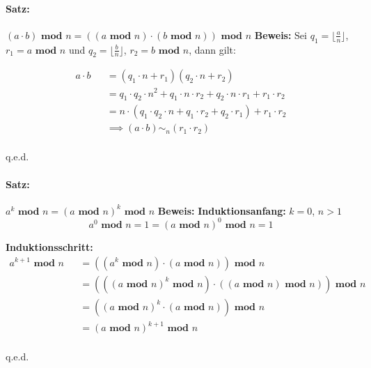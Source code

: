 \documentclass[12pt]{scrreprt}
\newcommand{\theorem}[1]{\paragraph{Satz:} #1\newline}
\renewcommand{\mod}{\textbf{ mod }}
\newenvironment{proof}
    {\textbf{Beweis:}\newline\indent}
    {\begin{flushright}q.e.d.\end{flushright}}
\begin{document}
                \theorem{$ (a \cdot b) \mod n = ((a \mod n) \cdot (b \mod n)) \mod n $}
                    \begin{proof}
                        Sei $ q _ 1 = \lfloor \frac{a}{n} \rfloor $, $ r _ 1 = a \mod n $ und $ q _ 2 = \lfloor \frac{b}{n} \rfloor $, $ r _ 2 = b \mod n $, dann gilt:

                        \begin{eqnarray*}
                                 a \cdot b
                            && = (q _ 1 \cdot n + r _ 1) (q _ 2 \cdot n + r _ 2)                                                            \\
                            && = q _ 1 \cdot q _ 2 \cdot n ^ 2 + q _ 1 \cdot n \cdot r _ 2 + q _ 2 \cdot n \cdot r _ 1 + r _ 1 \cdot r _ 2  \\
                            && = n \cdot (q _ 1 \cdot q _ 2 \cdot n + q _ 1 \cdot r _ 2 + q _ 2 \cdot r _ 1) + r _ 1 \cdot r _ 2            \\
                            && \implies (a \cdot b) \sim _ n (r _ 1 \cdot r _ 2)                                                            \\
                        \end{eqnarray*}
                    \end{proof}


                \theorem{$ a ^ k \mod n = (a \mod n) ^ k \mod n $}
                    \begin{proof}
                        \textbf{Induktionsanfang:} $ k = 0 $, $ n > 1 $
                        \[ a ^ 0 \mod n = 1 = (a \mod n) ^ 0 \mod n = 1 \]

                        \textbf{Induktionsschritt:}
                        \begin{eqnarray*}
                               a ^ { k + 1 } \mod n
                            && = ((a ^ k \mod n) \cdot (a \mod n)) \mod n                   \\
                            && = (((a \mod n) ^ k \mod n) \cdot ((a \mod n) \mod n)) \mod n \\
                            && = ((a \mod n) ^ k \cdot (a \mod n)) \mod n                   \\
                            && = (a \mod n) ^ { k + 1 } \mod n                              \\
                        \end{eqnarray*}
                    \end{proof}
\end{document}
